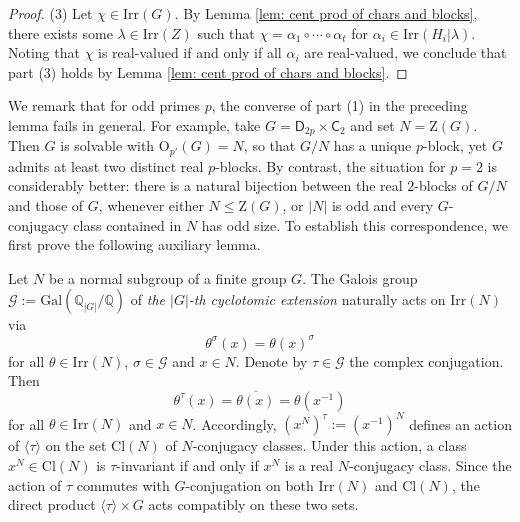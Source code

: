 \documentclass[10pt]{article}
\begin{document}
\begin{proof}
   


  (3) Let $\chi\in \mathrm{Irr}(G)$.
   By Lemma \ref{lem: cent prod of chars and blocks},
   there exists some $\lambda\in \mathrm{Irr}(Z)$
   such that $\chi=\alpha_1\circ \cdots \circ \alpha_t$ for $\alpha_i\in \mathrm{Irr}(H_i|\lambda)$.
   Noting that $\chi$ is real-valued if and only if all $\alpha_i$ are real-valued,
   we conclude that part (3) holds by Lemma \ref{lem: cent prod of chars and blocks}.
\end{proof}

  We remark that for odd primes $p$, the converse of part (1) in the preceding lemma fails in general. 
  For example, take $G = \mathsf{D}_{2p} \times \mathsf{C}_2$ and set $N = \mathrm{Z}(G)$. 
  Then $G$ is solvable with $\mathrm{O}_{p'}(G)=N$, so that $G/N$ has a unique $p$-block, yet $G$ admits at least two distinct real $p$-blocks. 
  By contrast, the situation for $p=2$ is considerably better: there is a natural bijection between the real $2$-blocks of $G/N$ and those of $G$, whenever either $N\leq \mathrm{Z}(G)$,
  or $|N|$ is odd and every $G$-conjugacy class contained in $N$ has odd size.
  To establish this correspondence, we first prove the following auxiliary lemma.



Let $N$ be a normal subgroup of a finite group $G$. 
The Galois group $\mathcal{G}:=\mathrm{Gal}(\mathbb{Q}_{|G|}/\mathbb{Q})$ of \emph{the $|G|$-th cyclotomic extension} naturally acts on $\mathrm{Irr}(N)$ via
\[
\theta^{\sigma}(x) = \theta(x)^{\sigma}
\]
for all $\theta \in \mathrm{Irr}(N)$, $\sigma \in \mathcal{G}$ and $x \in N$. 
Denote by $\tau\in\mathcal{G}$ the complex conjugation.
Then 
$$\theta^{\tau}(x)=\overline{\theta(x)}=\theta(x^{-1})$$ 
for all $\theta \in \mathrm{Irr}(N)$ and $x\in N$.
Accordingly, $(x^{N})^{\tau}:=(x^{-1})^{N}$ defines an action of $\langle \tau\rangle$ on 
the set $\mathrm{Cl}(N)$ of $N$-conjugacy classes.
Under this action, a class $x^N\in\mathrm{Cl}(N)$ is $\tau$-invariant if and only if $x^N$ is a real $N$-conjugacy class.
Since the action of $\tau$ commutes with $G$-conjugation  
on both $\mathrm{Irr}(N)$ and $\mathrm{Cl}(N)$,
the direct product $\langle \tau\rangle \times G$ acts compatibly on these two sets.
\end{document}
